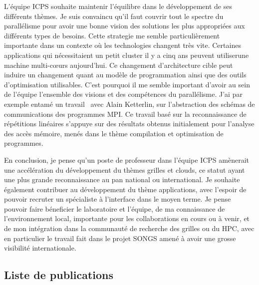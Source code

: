 \documentclass[11pt]{article}
\begin{document}
L'équipe ICPS souhaite maintenir l'équilibre dans le développement de ses
différents thèmes. Je suis convaincu qu'il faut couvrir tout le spectre du
parallélisme pour avoir une bonne vision des solutions les plus appropriées
aux différents types de besoins. Cette strategie me semble particulièrement
importante dans un contexte où les technologies changent très vite. Certaines
applications qui nécessitaient un petit cluster il y a cinq ans peuvent 
utiliserune machine multi-c{\oe}urs aujourd'hui. Ce changement d'architecture 
cible peut induire un changement quant au modèle de programmation ainsi que 
des outils d'optimisation utilisables. C'est pourquoi il me semble important
d'avoir au sein de l'équipe l'ensemble des visions et des compétences du
parallélisme. J'ai par exemple entamé un travail~\cite{ketterlin11} avec 
Alain Ketterlin, sur l'abstraction des schémas de communications des 
programmes MPI. Ce travail basé sur la reconnaissance de répétitions 
linéaires s'appuye sur des résultats obtenus initialement pour l'analyse des 
accès mémoire, menés dans le thème compilation et optimisation de programmes.

En conclusion, je pense qu'un poste de professeur dans l'équipe ICPS amènerait
une accélération du développement du thèmes grilles et clouds, ce statut
ayant une plus grande reconnaissance au pan national ou international. 
Je souhaite également contribuer au développement du thème applications,
avec l'espoir de pouvoir recruter un spécialiste à l'interface dans le 
moyen terme. Je pense pouvoir faire  béneficier le laboratoire et l'équipe, de 
ma connaissance de l'environnement local, importante pour les collaborations en 
cours ou à venir, et de mon intégration dans la communauté de recherche des
grilles ou du HPC, avec en particulier le travail fait dans le projet SONGS
amené à avoir une grosse visibilité internationale.


\newpage

\subsection{Liste de publications}
\end{document}
